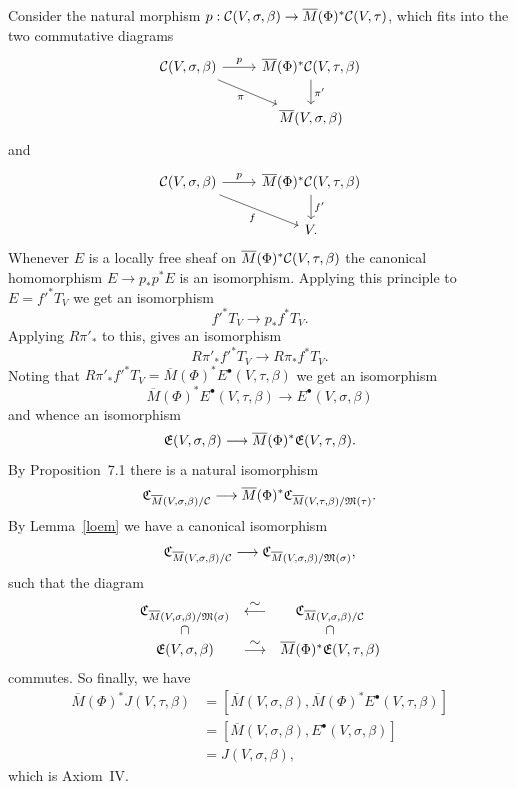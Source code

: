 \documentclass{article}
\newcommand{\upst}{^{\ast}}
\newcommand{\lst}{_{\ast}}
\newcommand{\com}{^{\scriptscriptstyle\bullet}}
\newcommand{\EE}{{\frak E}}
\newcommand{\MM}{{\frak M}}
\newcommand{\CC}{{\frak C}}
\newcommand{\cC}{{\cal C}}
\newcommand{\ol}{\overline}
\newcommand{\rdiag}[1]%
       {\makebox[0cm]{$\phantom{\scriptstyle#1}\downarrow{\scriptstyle#1}$}}
\newcommand{\sediag}[1]%
       {\makebox[0cm]{${\scriptstyle#1}\searrow\phantom{\scriptstyle#1}$}}
\newcommand{\longiso}{\stackrel{\textstyle\sim}{\longrightarrow}}
\newcommand{\longisoback}{\stackrel{\textstyle\sim}{\longleftarrow}}
\newcommand{\comtri}[6]{%
\begin{array}{ccc}
#1 & \stackrel{#2}{\longrightarrow} & #3         \\
   & \sediag{#4}                    & \rdiag{#5} \\
   &                                & #6
\end{array}}
\begin{document}
Consider the natural morphism
$p:\cC(V,\sigma,\beta)\rightarrow\ol{M}(\Phi)\upst\cC(V,\tau)$, which
fits into the two commutative diagrams
\[
\begin{tikzcd}
  \cC(V,\sigma,\beta) \rar["p"] \drar["\pi"'] & \ol{M}(\Phi)\upst \cC(V,\tau,\beta) \dar["\pi'"]\\
  & \ol{M}(V,\sigma,\beta)
\end{tikzcd}
\]
and
\[
\begin{tikzcd}
  \cC(V,\sigma,\beta) \rar["p"] \drar["f"'] & \ol{M}(\Phi)\upst \cC(V,\tau,\beta) \dar["f'"]\\
  & V .
\end{tikzcd}
\]
Whenever $E$ is a locally free sheaf on
$\ol{M}(\Phi)\upst\cC(V,\tau,\beta)$ the canonical homomorphism
$E\rightarrow p\lst p\upst E$ is an isomorphism. Applying this
principle to $E={f'}\upst T_V$ we get an isomorphism
\[{f'}\upst T_V\longrightarrow p\lst f\upst T_V.\]
Applying $R\pi'\lst$ to this, gives an isomorphism
\[R\pi'\lst {f'}\upst T_V\longrightarrow R\pi\lst f\upst T_V.\]
Noting that $R\pi'\lst{f'}\upst T_V=\ol{M}(\Phi)\upst
E\com(V,\tau,\beta)$ we get an isomorphism
\[\ol{M}(\Phi)\upst E\com(V,\tau,\beta)\longrightarrow
E\com(V,\sigma,\beta)\]
and whence an isomorphism
\[\EE(V,\sigma,\beta)\longrightarrow\ol{M}(\Phi)\upst
\EE(V,\tau,\beta).\]
By \cite{BF} Proposition~7.1 there is a natural isomorphism
\[\CC_{\ol{M}(V,\sigma,\beta)/\cC}\longrightarrow\ol{M}(\Phi)\upst
\CC_{\ol{M}(V,\tau,\beta)/\MM(\tau)}.\]
By Lemma~\ref{loem} we have a canonical isomorphism
\[\CC_{\ol{M}(V,\sigma,\beta)/\cC}\longrightarrow
\CC_{\ol{M}(V,\sigma,\beta)/\MM(\sigma)},\]
such that the diagram
\[\begin{array}{ccc}
\CC_{\ol{M}(V,\sigma,\beta)/\MM(\sigma)} & \longisoback &
\CC_{\ol{M}(V,\sigma,\beta)/\cC} \\
\cap & & \cap\\
\EE(V,\sigma,\beta) & \longiso  & \ol{M}(\Phi)\upst
\EE(V,\tau,\beta)\end{array}\]
commutes. So finally, we have
\begin{align*}
\ol{M}(\Phi)\upst J(V,\tau,\beta) &= [\ol{M}(V,\sigma,\beta),
\ol{M}(\Phi)\upst E\com(V,\tau,\beta)]\\
&= [\ol{M}(V,\sigma,\beta),E\com(V,\sigma,\beta)]\\
&= J(V,\sigma,\beta),
\end{align*}
which is Axiom~IV.
\end{document}
